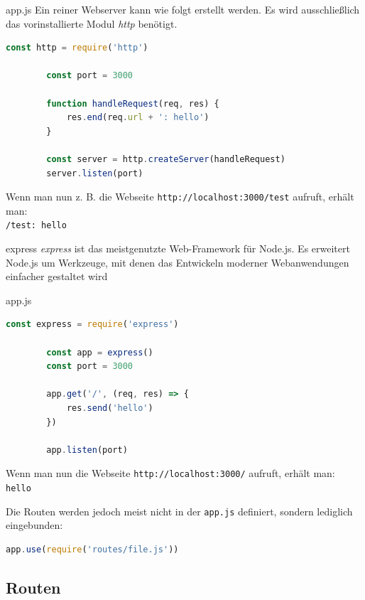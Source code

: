 \begin{example}{app.js}
    Ein reiner Webserver kann wie folgt erstellt werden.
    Es wird ausschließlich das vorinstallierte Modul \emph{http} benötigt.

    \begin{lstlisting}[language=JavaScript]
        const http = require('http')

        const port = 3000

        function handleRequest(req, res) {
            res.end(req.url + ': hello')
        }

        const server = http.createServer(handleRequest)
        server.listen(port)
    \end{lstlisting}

    Wenn man nun z. B. die Webseite \texttt{http://localhost:3000/test} aufruft, erhält man:\\
    \texttt{/test: hello}
\end{example}

\begin{defi}{express}
    \emph{express} ist das meistgenutzte Web-Framework für Node.js.
    Es erweitert Node.js um Werkzeuge, mit denen das Entwickeln moderner Webanwendungen einfacher gestaltet wird
\end{defi}

\begin{example}{app.js}
    \begin{lstlisting}[language=JavaScript]
        const express = require('express')
        
        const app = express()
        const port = 3000

        app.get('/', (req, res) => {
            res.send('hello')
        })

        app.listen(port)
    \end{lstlisting}

    Wenn man nun die Webseite \texttt{http://localhost:3000/} aufruft, erhält man:\\
    \texttt{hello}

    Die Routen werden jedoch meist nicht in der \texttt{app.js} definiert, sondern lediglich eingebunden:
    \begin{lstlisting}[language=JavaScript]
        app.use(require('routes/file.js'))
    \end{lstlisting}
\end{example}

\subsection{Routen}

